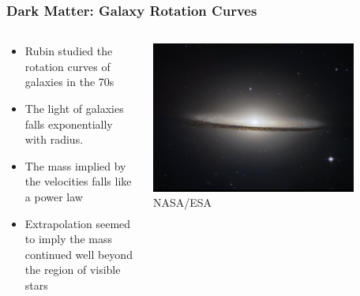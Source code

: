 \documentclass{beamer}
\begin{document}
\frame
{
    \frametitle{Dark Matter: Galaxy Rotation Curves}

    \begin{columns}
        \begin{column}{0.5\textwidth}    
            \begin{itemize}

                \item Rubin studied the rotation curves of galaxies in the 70s

                \item The light of galaxies falls exponentially with radius.

                \item The mass implied by the velocities falls like a power law

                \item Extrapolation seemed to imply the mass continued well
                    beyond the region of visible stars

            \end{itemize}
        \end{column}
        \begin{column}{0.5\textwidth}
            \begin{center}
                \includegraphics[width=0.8\textwidth]{m104-2013-03-01-HLA-5238-HLA-crop.jpg}
                \newline
                {\tiny NASA/ESA}


\end{center}
\end{column}
\end{columns}}
\end{document}
